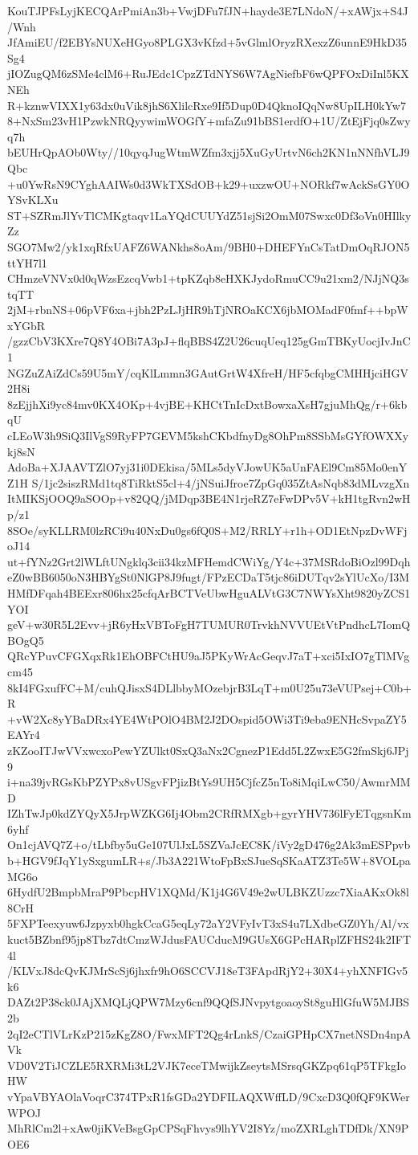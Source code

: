 KouTJPFsLyjKECQArPmiAn3b+VwjDFu7fJN+hayde3E7LNdoN/+xAWjx+S4J/Wnh
JfAmiEU/f2EBYsNUXeHGyo8PLGX3vKfzd+5vGlmlOryzRXexzZ6unnE9HkD35Sg4
jIOZugQM6zSMe4clM6+RuJEdc1CpzZTdNYS6W7AgNiefbF6wQPFOxDiInl5KXNEh
R+kznwVIXX1y63dx0uVik8jhS6XlilcRxe9If5Dup0D4QknoIQqNw8UpILH0kYw7
8+NxSm23vH1PzwkNRQyywimWOGfY+mfaZu91bBS1erdfO+1U/ZtEjFjq0sZwyq7h
bEUHrQpAOb0Wty//10qyqJugWtmWZfm3xjj5XuGyUrtvN6ch2KN1nNNfhVLJ9Qbc
+u0YwRsN9CYghAAIWs0d3WkTXSdOB+k29+uxzwOU+NORkf7wAckSsGY0OYSvKLXu
ST+SZRmJlYvTlCMKgtaqv1LaYQdCUUYdZ51sjSi2OmM07Swxc0Df3oVn0HIlkyZz
SGO7Mw2/yk1xqRfxUAFZ6WANkhs8oAm/9BH0+DHEFYnCsTatDmOqRJON5ttYH7l1
CHmzeVNVx0d0qWzsEzcqVwb1+tpKZqb8eHXKJydoRmuCC9u21xm2/NJjNQ3stqTT
2jM+rbnNS+06pVF6xa+jbh2PzLJjHR9hTjNROaKCX6jbMOMadF0fmf++bpWxYGbR
/gzzCbV3KXre7Q8Y4OBi7A3pJ+flqBBS4Z2U26cuqUeq125gGmTBKyUocjIvJnC1
NGZuZAiZdCs59U5mY/cqKlLmmn3GAutGrtW4XfreH/HF5cfqbgCMHHjciHGV2H8i
8zEjjhXi9yc84mv0KX4OKp+4vjBE+KHCtTnIcDxtBowxaXsH7gjuMhQg/r+6kbqU
cLEoW3h9SiQ3IlVgS9RyFP7GEVM5kshCKbdfnyDg8OhPm8SSbMsGYfOWXXykj8sN
AdoBa+XJAAVTZlO7yj31i0DEkisa/5MLs5dyVJowUK5aUnFAEl9Cm85Mo0enYZ1H
S/1jc2siszRMd1tq8TiRktS5cl+4/jNSuiJfroe7ZpGq035ZtAsNqb83dMLvzgXn
ItMIKSjOOQ9aSOOp+v82QQ/jMDqp3BE4N1rjeRZ7eFwDPv5V+kH1tgRvn2wHp/z1
8SOe/syKLLRM0lzRCi9u40NxDu0gs6fQ0S+M2/RRLY+r1h+OD1EtNpzDvWFjoJ14
ut+fYNz2Grt2lWLftUNgklq3cii34kzMFHemdCWiYg/Y4c+37MSRdoBiOzl99Dqh
eZ0wBB6050oN3HBYgSt0NlGP8J9fugt/FPzECDaT5tjc86iDUTqv2sYlUcXo/I3M
HMfDFqah4BEExr806hx25cfqArBCTVeUbwHguALVtG3C7NWYsXht9820yZCS1YOI
geV+w30R5L2Evv+jR6yHxVBToFgH7TUMUR0TrvkhNVVUEtVtPndhcL7IomQBOgQ5
QRcYPuvCFGXqxRk1EhOBFCtHU9aJ5PKyWrAcGeqvJ7aT+xci5IxIO7gTlMVgcm45
8kI4FGxufFC+M/cuhQJisxS4DLlbbyMOzebjrB3LqT+m0U25u73eVUPsej+C0b+R
+vW2Xc8yYBaDRx4YE4WtPOlO4BM2J2DOspid5OWi3Ti9eba9ENHcSvpaZY5EAYr4
zKZooITJwVVxwcxoPewYZUlkt0SxQ3aNx2CgnezP1Edd5L2ZwxE5G2fmSkj6JPj9
i+na39jvRGsKbPZYPx8vUSgvFPjizBtYs9UH5CjfcZ5nTo8iMqiLwC50/AwmrMMD
IZhTwJp0kdZYQyX5JrpWZKG6Ij4Obm2CRfRMXgb+gyrYHV736lFyETqgsnKm6yhf
On1cjAVQ7Z+o/tLbfby5uGe107UlJxL5SZVaJcEC8K/iVy2gD476g2Ak3mESPpvb
b+HGV9fJqY1ySxgumLR+s/Jb3A221WtoFpBxSJueSqSKaATZ3Te5W+8VOLpaMG6o
6HydfU2BmpbMraP9PbcpHV1XQMd/K1j4G6V49e2wULBKZUzzc7XiaAKxOk8l8CrH
5FXPTeexyuw6Jzpyxb0hgkCcaG5eqLy72aY2VFyIvT3xS4u7LXdbeGZ0Yh/Al/vx
kuct5BZbnf95jp8Tbz7dtCmzWJdusFAUCducM9GUsX6GPcHARplZFHS24k2IFT4l
/KLVxJ8dcQvKJMrScSj6jhxfr9hO6SCCVJ18eT3FApdRjY2+30X4+yhXNFIGv5k6
DAZt2P38ck0JAjXMQLjQPW7Mzy6cnf9QQfSJNvpytgoaoySt8guHlGfuW5MJBS2b
2qI2eCTlVLrKzP215zKgZ8O/FwxMFT2Qg4rLnkS/CzaiGPHpCX7netNSDn4npAVk
VD0V2TiJCZLE5RXRMi3tL2VJK7eceTMwijkZseytsMSrsqGKZpq61qP5TFkgIoHW
vYpaVBYAOlaVoqrC374TPxR1fsGDa2YDFILAQXWffLD/9CxcD3Q0fQF9KWerWPOJ
MhRlCm2l+xAw0jiKVeBsgGpCPSqFhvys9lhYV2I8Yz/moZXRLghTDfDk/XN9POE6
